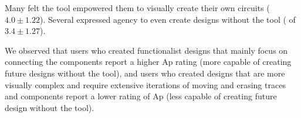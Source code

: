 \documentclass{sigchi}
\begin{document}
  Many felt the tool empowered them to visually create their own circuits ( $4.0 \pm 1.22$). Several expressed agency to even create designs without the tool ( of $3.4 \pm 1.27$). 
  
  We observed that users who created functionalist designs that mainly focus on connecting the components report a higher Ap rating (more capable of creating future designs without the tool), and users who created designs that are more visually complex and require extensive iterations of moving and erasing traces and components report a lower rating of Ap (less capable of creating future design without the tool). 
  

\end{document}

